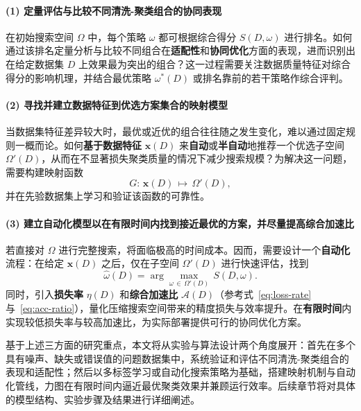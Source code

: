 \documentclass[10pt]{article} %
\numberwithin{equation}{section}
\begin{document}
\paragraph{(1) 定量评估与比较不同清洗-聚类组合的协同表现}
在初始搜索空间 \(\Omega\) 中，每个策略 \(\omega\) 都可根据综合得分 \(S(D,\omega)\) 进行排名。如何通过该排名定量分析与比较不同组合在\textbf{适配性}和\textbf{协同优化}方面的表现，进而识别出在给定数据集 \(D\) 上效果最为突出的组合？这一过程需要关注数据质量特征对综合得分的影响机理，并结合最优策略 \(\omega^*(D)\) 或排名靠前的若干策略作综合评判。

\paragraph{(2) 寻找并建立数据特征到优选方案集合的映射模型}
当数据集特征差异较大时，最优或近优的组合往往随之发生变化，难以通过固定规则一概而论。如何\textbf{基于数据特征} \(\mathbf{x}(D)\) 来\textbf{自动}或\textbf{半自动}地推荐一个优选子空间 \(\Omega'(D)\)，从而在不显著损失聚类质量的情况下减少搜索规模？为解决这一问题，需要构建映射函数
\[
  G:\,\mathbf{x}(D)\,\mapsto\,\Omega'(D),
\]
并在先验数据集上学习和验证该函数的可靠性。

\paragraph{(3) 建立自动化模型以在有限时间内找到接近最优的方案，并尽量提高综合加速比}
若直接对 \(\Omega\) 进行完整搜索，将面临极高的时间成本。因而，需要设计一个\textbf{自动化}流程：在给定 \(\mathbf{x}(D)\) 之后，仅在子空间 \(\Omega'(D)\) 进行快速评估，找到
\begin{equation}\label{eq:local best strategy}
  \hat{\omega}(D) 
  = 
  \arg\max_{\omega \,\in\,\Omega'(D)} \, S(D,\omega).
\end{equation}
同时，引入\textbf{损失率} \(\eta(D)\) 和\textbf{综合加速比} \(\mathcal{A}(D)\)（参考式~\eqref{eq:loss-rate} 与~\eqref{eq:acc-ratio}），量化压缩搜索空间带来的精度损失与效率提升。在\textbf{有限时间}内实现较低损失率与较高加速比，为实际部署提供可行的协同优化方案。

基于上述三方面的研究重点，本文将从实验与算法设计两个角度展开：首先在多个具有噪声、缺失或错误值的问题数据集中，系统验证和评估不同清洗-聚类组合的表现和适配性；然后以多标签学习或自动化搜索策略为基础，搭建映射机制与自动化管线，力图在有限时间内逼近最优聚类效果并兼顾运行效率。后续章节将对具体的模型结构、实验步骤及结果进行详细阐述。

\end{document}
